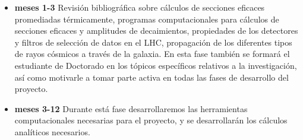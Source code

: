 \begin{itemize}
\item \textbf{meses 1-3} Revisión bibliográfica sobre cálculos de
  secciones eficaces promediadas térmicamente, programas
  computacionales para cálculos de secciones eficaces y amplitudes de
  decaimientos, propiedades de los detectores y filtros de selección
  de datos en el LHC, propagación de los diferentes tipos de rayos
  cósmicos a través de la galaxia.  En esta fase también se formará el
  estudiante de Doctorado en los tópicos específicos relativos a la
  investigación, así como motivarle a tomar parte activa en todas las
  fases de desarrollo del proyecto.

\item \textbf{meses 3-12} Durante está fase desarrollaremos las
  herramientas computacionales necesarias para el proyecto, y se
  desarrollarán los cálculos analíticos necesarios.


\end{itemize}
